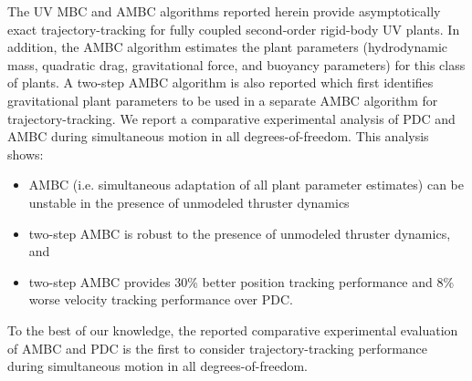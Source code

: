 The \ac{UV} \ac{MBC} and \ac{AMBC} algorithms reported herein provide
asymptotically exact trajectory-tracking for fully coupled
second-order rigid-body \ac{UV} plants.
%
In addition, the \ac{AMBC} algorithm estimates the plant parameters
(hydrodynamic mass, quadratic drag, gravitational force, and buoyancy
parameters) for this class of plants.
%
A two-step \ac{AMBC} algorithm is also reported which first identifies
gravitational plant parameters to be used in a separate \ac{AMBC}
algorithm for trajectory-tracking.
%
%
%
%
We report a comparative experimental analysis of \ac{PDC} and \ac{AMBC}
during simultaneous motion in all degrees-of-freedom. This analysis shows:
\begin{itemize}
\item \ac{AMBC} (i.e. simultaneous adaptation of all plant parameter estimates)
can be unstable in the presence of unmodeled thruster dynamics
% 
\item two-step \ac{AMBC} is robust to the presence of unmodeled
thruster dynamics, and
%
\item two-step \ac{AMBC} provides 30\% better position tracking
performance and 8\% worse velocity tracking performance over \ac{PDC}.
\end{itemize}
%
To the best of our knowledge, the reported comparative experimental
evaluation of \ac{AMBC} and \ac{PDC} is the first to consider
trajectory-tracking performance during simultaneous motion in all
degrees-of-freedom.
